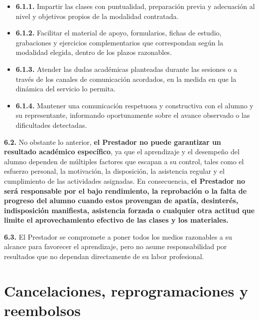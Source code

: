 \documentclass[12pt, letterpaper]{article}
\begin{document}
\begin{itemize}[leftmargin=1.5em, itemsep=3pt, topsep=4pt]
  \item \textbf{6.1.1.} Impartir las clases con puntualidad, preparación previa y adecuación al nivel y objetivos propios de la modalidad contratada.
  \item \textbf{6.1.2.} Facilitar el material de apoyo, formularios, fichas de estudio, grabaciones y ejercicios complementarios que correspondan según la modalidad elegida, dentro de los plazos razonables.
  \item \textbf{6.1.3.} Atender las dudas académicas planteadas durante las sesiones o a través de los canales de comunicación acordados, en la medida en que la dinámica del servicio lo permita.
  \item \textbf{6.1.4.} Mantener una comunicación respetuosa y constructiva con el alumno y su representante, informando oportunamente sobre el avance observado o las dificultades detectadas.
\end{itemize}

\vspace{4pt}
\begin{cuadroadvertencia}
  \noindent\textbf{6.2.} No obstante lo anterior, \textbf{el Prestador no puede garantizar un resultado académico específico}, ya que el aprendizaje y el desempeño del alumno dependen de múltiples factores que escapan a su control, tales como el esfuerzo personal, la motivación, la disposición, la asistencia regular y el cumplimiento de las actividades asignadas. En consecuencia, \textbf{el Prestador no será responsable por el bajo rendimiento, la reprobación o la falta de progreso del alumno cuando estos provengan de apatía, desinterés, indisposición manifiesta, asistencia forzada o cualquier otra actitud que limite el aprovechamiento efectivo de las clases y los materiales.}
\end{cuadroadvertencia}

\vspace{4pt}
\noindent\textbf{6.3.} El Prestador se compromete a poner todos los medios razonables a su alcance para favorecer el aprendizaje, pero no asume responsabilidad por resultados que no dependan directamente de su labor profesional.

\section{Cancelaciones, reprogramaciones y reembolsos}
\end{document}
